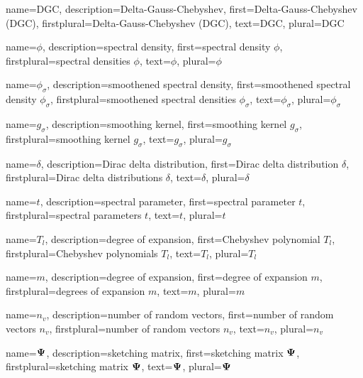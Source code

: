 {%
  name={DGC},%
  description={Delta-Gauss-Chebyshev},%
  first={Delta-Gauss-Chebyshev (DGC)},%
  firstplural={Delta-Gauss-Chebyshev (DGC)},%
  text={DGC},%
  plural={DGC}%
}


{%
  name={$\phi$},%
  description={spectral density},%
  first={spectral density $\phi$},%
  firstplural={spectral densities $\phi$},%
  text={$\phi$},%
  plural={$\phi$}%
}

{%
  name={$\phi_{\sigma}$},%
  description={smoothened spectral density},%
  first={smoothened spectral density $\phi_{\sigma}$},%
  firstplural={smoothened spectral densities $\phi_{\sigma}$},%
  text={$\phi_{\sigma}$},%
  plural={$\phi_{\sigma}$}%
}

{%
  name={$g_{\sigma}$},%
  description={smoothing kernel},%
  first={smoothing kernel $g_{\sigma}$},%
  firstplural={smoothing kernel $g_{\sigma}$},%
  text={$g_{\sigma}$},%
  plural={$g_{\sigma}$}%
}

{%
  name={$\delta$},%
  description={Dirac delta distribution},%
  first={Dirac delta distribution $\delta$},%
  firstplural={Dirac delta distributions $\delta$},%
  text={$\delta$},%
  plural={$\delta$}%
}

{%
  name={$t$},%
  description={spectral parameter},%
  first={spectral parameter $t$},%
  firstplural={spectral parameters $t$},%
  text={$t$},%
  plural={$t$}%
}

{%
  name={$T_l$},%
  description={degree of expansion},%
  first={Chebyshev polynomial $T_l$},%
  firstplural={Chebyshev polynomials $T_l$},%
  text={$T_l$},%
  plural={$T_l$}%
}

{%
  name={$m$},%
  description={degree of expansion},%
  first={degree of expansion $m$},%
  firstplural={degrees of expansion $m$},%
  text={$m$},%
  plural={$m$}%
}

{%
  name={$n_v$},%
  description={number of random vectors},%
  first={number of random vectors $n_v$},%
  firstplural={number of random vectors $n_v$},%
  text={$n_v$},%
  plural={$n_v$}%
}

{%
  name={$\boldsymbol{\Psi}$},%
  description={sketching matrix},%
  first={sketching matrix $\boldsymbol{\Psi}$},%
  firstplural={sketching matrix $\boldsymbol{\Psi}$},%
  text={$\boldsymbol{\Psi}$},%
  plural={$\boldsymbol{\Psi}$}%
}

